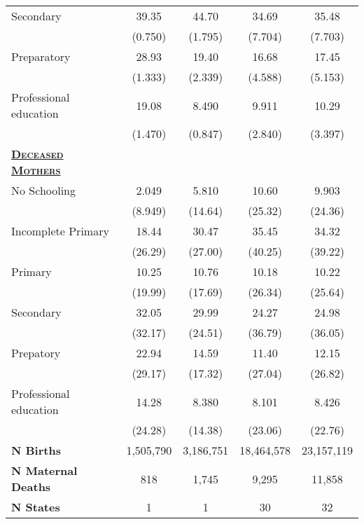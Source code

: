 {\begin{tabular}{lcccc}
  Secondary&       39.35&       44.70&       34.69&       35.48\\
	&     (0.750)&     (1.795)&     (7.704)&     (7.703)\\
  Preparatory&       28.93&       19.40&       16.68&       17.45\\
	&     (1.333)&     (2.339)&     (4.588)&     (5.153)\\
	
  Professional education&       19.08&       8.490&       9.911&       10.29\\
	&     (1.470)&     (0.847)&     (2.840)&     (3.397)\\
	 
  
 \textsc{\textbf{\underline{Deceased Mothers}}}		&&&&\\
 
 
  No Schooling &       2.049&       5.810&       10.60&       9.903\\
	&     (8.949)&     (14.64)&     (25.32)&     (24.36)\\
  Incomplete Primary &       18.44&       30.47&       35.45&       34.32\\
	&     (26.29)&     (27.00)&     (40.25)&     (39.22)\\
  Primary  &       10.25&       10.76&       10.18&       10.22\\
	&     (19.99)&     (17.69)&     (26.34)&     (25.64)\\
  Secondary &       32.05&       29.99&       24.27&       24.98\\
	&     (32.17)&     (24.51)&     (36.79)&     (36.05)\\
  Prepatory &       22.94&       14.59&       11.40&       12.15\\
	&     (29.17)&     (17.32)&     (27.04)&     (26.82)\\
  Professional education &       14.28&       8.380&       8.101&       8.426\\
	&     (24.28)&     (14.38)&     (23.06)&     (22.76)\\\hline
\textbf{N Births}& 1,505,790 & 3,186,751& 18,464,578& 23,157,119  \\ 
\textbf{N Maternal Deaths}& 818 & 1,745 & 9,295 & 11,858\\
\textbf{N States} & 1&1&30&32\\
 	\hline\hline
\end{tabular}}
 
 
 
